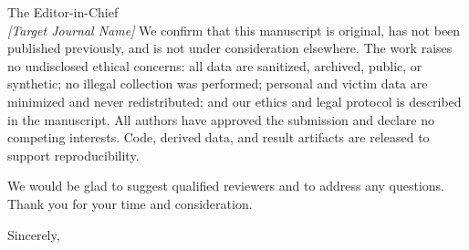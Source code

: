 \documentclass[11pt,a4paper]{letter}
\begin{document}
\begin{letter}{The Editor-in-Chief \\ \emph{[Target Journal Name]}}
We confirm that this manuscript is original, has not been published previously, and is
not under consideration elsewhere. The work raises no undisclosed ethical concerns: all
data are sanitized, archived, public, or synthetic; no illegal collection was performed;
personal and victim data are minimized and never redistributed; and our ethics and legal
protocol is described in the manuscript. All authors have approved the submission and
declare no competing interests. Code, derived data, and result artifacts are released to
support reproducibility.

We would be glad to suggest qualified reviewers and to address any questions. Thank you
for your time and consideration.

\closing{Sincerely,}

\end{letter}
\end{document}
